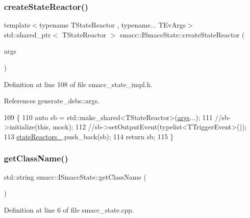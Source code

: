 \subsubsection{\texorpdfstring{create\+State\+Reactor()}{createStateReactor()}\hspace{0.1cm}{\footnotesize\ttfamily [2/2]}}
{\footnotesize\ttfamily template$<$typename T\+State\+Reactor , typename... T\+Ev\+Args$>$ \\
std\+::shared\+\_\+ptr$<$ T\+State\+Reactor $>$ smacc\+::\+I\+Smacc\+State\+::create\+State\+Reactor (\begin{DoxyParamCaption}\item[{T\+Ev\+Args...}]{args }\end{DoxyParamCaption})}



Definition at line 108 of file smacc\+\_\+state\+\_\+impl.\+h.



References generate\+\_\+debs\+::args.


\begin{DoxyCode}
109 \{
110     \textcolor{keyword}{auto} sb = std::make\_shared<TStateReactor>(\hyperlink{namespacegenerate__debs_a75f9143e38df82d83b2e8a6f99cae02c}{args}...);
111     \textcolor{comment}{//sb->initialize(this, mock);}
112     \textcolor{comment}{//sb->setOutputEvent(typelist<TTriggerEvent>());}
113     \hyperlink{classsmacc_1_1ISmaccState_a7410a353b515f7b7357e94ef619a6c45}{stateReactors\_}.push\_back(sb);
114     \textcolor{keywordflow}{return} sb;
115 \}
\end{DoxyCode}
\mbox{\label{classsmacc_1_1ISmaccState_a5bf0b49d5ea6b9e8f45c26fa155b2664}} 
\subsubsection{\texorpdfstring{get\+Class\+Name()}{getClassName()}}
{\footnotesize\ttfamily std\+::string smacc\+::\+I\+Smacc\+State\+::get\+Class\+Name (\begin{DoxyParamCaption}{ }\end{DoxyParamCaption})\hspace{0.3cm}{\ttfamily [virtual]}}



Definition at line 6 of file smacc\+\_\+state.\+cpp.



